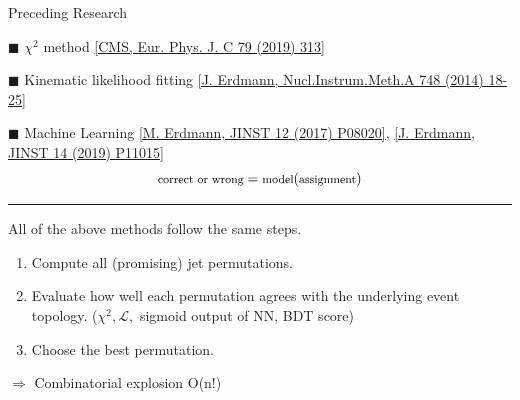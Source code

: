 \begin{frame}[fragile]{Preceding Research}
  \begin{block}{$\blacksquare$ $\chi^{2}$ method {\scriptsize \href{https://link.springer.com/article/10.1140\%2Fepjc\%2Fs10052-019-6788-2}{[CMS, Eur. Phys. J. C 79 (2019) 313]}}}
      \centering
      \smallskip
  \end{block}
  
  \begin{block}{$\blacksquare$ Kinematic likelihood fitting {\scriptsize \href{https://www.sciencedirect.com/science/article/pii/S0168900214001855?via\%3Dihub}{[J. Erdmann, Nucl.Instrum.Meth.A 748 (2014) 18-25]}}}
      \centering
      \smallskip
  \end{block}

  \begin{block}{$\blacksquare$ Machine Learning {
        \tiny
        \href{https://iopscience.iop.org/article/10.1088/1748-0221/12/08/P08020}{[M. Erdmann, JINST 12 (2017) P08020]},
        \href{https://iopscience.iop.org/article/10.1088/1748-0221/14/11/P11015}{[J. Erdmann, JINST 14 (2019) P11015]}
      }
    }
    $${\textrm{\footnotesize correct or wrong} = \textrm{\footnotesize model}(\textrm{\footnotesize assignment})}$$
  \end{block}

  \vspace{4pt}
    \hrule
  \vspace{4pt}

  All of the above methods follow the same steps.

  \begin{enumerate}
      \item Compute all (promising) jet permutations.
      \item Evaluate how well each permutation agrees with the underlying event topology.
            {(\scriptsize $\chi^{2}, \mathcal{L},$ sigmoid output of NN, BDT score)}
      \item Choose the best permutation.
  \end{enumerate}
  
  $\Rightarrow$ Combinatorial explosion O(n!)
\end{frame}

